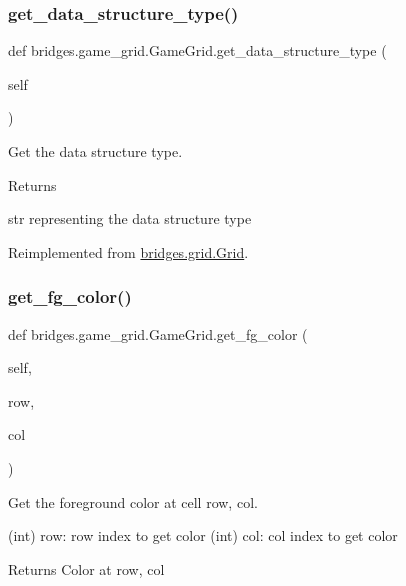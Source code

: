 \subsubsection{\texorpdfstring{get\_data\_structure\_type()}{get\_data\_structure\_type()}}
{\footnotesize\ttfamily def bridges.\+game\+\_\+grid.\+Game\+Grid.\+get\+\_\+data\+\_\+structure\+\_\+type (\begin{DoxyParamCaption}\item[{}]{self }\end{DoxyParamCaption})}



Get the data structure type. 

\begin{DoxyReturn}{Returns}


str representing the data structure type 
\end{DoxyReturn}


Reimplemented from \mbox{\hyperlink{classbridges_1_1grid_1_1_grid_af7a6658d4512112c2888afc6cd946461}{bridges.\+grid.\+Grid}}.

\mbox{\label{classbridges_1_1game__grid_1_1_game_grid_a15d1ca83a190c46c79404cb03ba35fc3}} 
\subsubsection{\texorpdfstring{get\_fg\_color()}{get\_fg\_color()}}
{\footnotesize\ttfamily def bridges.\+game\+\_\+grid.\+Game\+Grid.\+get\+\_\+fg\+\_\+color (\begin{DoxyParamCaption}\item[{}]{self,  }\item[{int}]{row,  }\item[{int}]{col }\end{DoxyParamCaption})}



Get the foreground color at cell row, col. 

\begin{DoxyVerb}       (int) row: row index to get color
       (int) col: col index to get color
\end{DoxyVerb}
 \begin{DoxyReturn}{Returns}
Color at row, col 
\end{DoxyReturn}
\mbox{\label{classbridges_1_1game__grid_1_1_game_grid_a15cac5e46e16ada68b0bfe6eb6ac2609}} 
